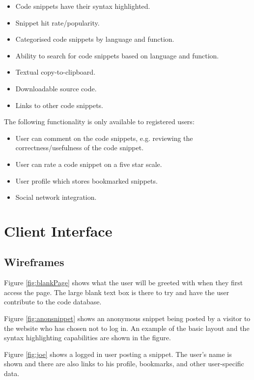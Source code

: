 \documentclass{sig-alt-release2}
\begin{document}
\begin{itemize}
\item Code snippets have their syntax highlighted.
\item Snippet hit rate/popularity.
\item Categorised code snippets by language and function.
\item Ability to search for code snippets based on language and
function.
\item Textual copy-to-clipboard.
\item Downloadable source code.
\item Links to other code snippets.
\end{itemize}

The following functionality is only available to registered users:
\label{sec:restrict}

\begin{itemize}
\item User can comment on the code snippets, e.g. reviewing the
correctness/usefulness of the code snippet.
\item User can rate a code snippet on a five star scale.
\item User profile which stores bookmarked snippets.
\item Social network integration.
\end{itemize}

\section{Client Interface}

\subsection{Wireframes}

Figure \ref{fig:blankPage} shows what the user will be greeted with when they
first access the page. The large blank text box is there to try and have the
user contribute to the code database.

Figure \ref{fig:anonsnippet} shows an anonymous snippet being posted by a
visitor to the website who has chosen not to log in. An example of the basic
layout and the syntax highlighting capabilities are shown in the figure.

Figure \ref{fig:joe} shows a logged in user posting a snippet. The user's
name is shown and there are also links to his profile, bookmarks, and other
user-specific data.
\end{document}
